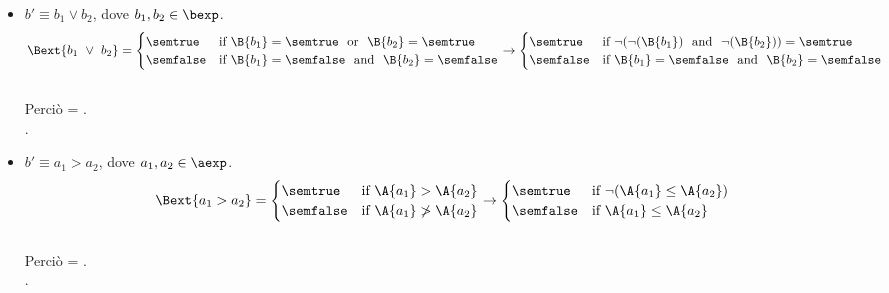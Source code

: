 {\begin{enumerate}[label=(\alph*)]
\begin{itemize}
    \item $ b' \equiv b_1 \lor b_2$, dove $b_1, b_2 \in \bexp$. \\
      \begin{align*}
        \Bext{b_1 \ \lor \ b_2} =
        \begin{cases}
        \semtrue &
        \mbox{if} \ \B{b_1} = \semtrue \ \mbox{ or } \ 
              \B{b_2} = \semtrue \\
        \semfalse &
        \mbox{if} \ \B{b_1} = \semfalse \ \mbox{ and } \ 
              \B{b_2} = \semfalse \\
        \end{cases}
        \rightarrow
        \begin{cases}
        \semtrue &
        \mbox{if} \ \lnot (\lnot (\B{b_1}) \ \mbox{ and } \
              \lnot (\B{b_2})) = \semtrue \\
        \semfalse &
        \mbox{if} \ \B{b_1} = \semfalse \ \mbox{ and } \
              \B{b_2} = \semfalse \\
        \end{cases}
      \end{align*} \\
      Perciò \Bext{b_1 \lor b_2} = \B{\lnot (\lnot (\B{b_1}) \land
        \lnot (\B{b_2}))}. \\.

    \item $ b' \equiv a_1 > a_2$, dove $a_1, a_2 \in \aexp$. \\
      \begin{align*} 
       \Bext{a_1 > a_2} = 
        \begin{cases} 
        \semtrue & 
        \mbox{if} \ \A{a_1} > \A{a_2}\\ 
        \semfalse & 
        \mbox{if} \ \A{a_1} \not > \A{a_2}\\
        \end{cases} 
        \rightarrow
        \begin{cases} 
        \semtrue & 
        \mbox{if} \ \lnot (\A{a_1} \leq \A{a_2})\\ 
        \semfalse & 
        \mbox{if} \ \A{a_1} \leq \A{a_2}\\
        \end{cases} 
      \end{align*} \\
      Perciò  = . \\.


\end{itemize}
\end{enumerate}}
